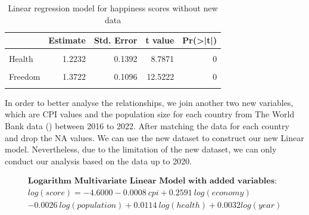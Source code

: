\documentclass[11pt,a4paper,]{article}
\begin{document}
\begin{table}

\caption{\label{tab:without}Linear regression model for happiness scores without new data}
\centering
\begin{tabular}[t]{l|r|r|r|r}
\hline
  & Estimate & Std. Error & t value & Pr(>|t|)\\
\hline
\cellcolor{gray!6}{(Intercept)} & \cellcolor{gray!6}{2.4374} & \cellcolor{gray!6}{0.0753} & \cellcolor{gray!6}{32.3704} & \cellcolor{gray!6}{0}\\
\hline
Health & 1.2232 & 0.1392 & 8.7871 & 0\\
\hline
\cellcolor{gray!6}{Economy} & \cellcolor{gray!6}{1.4543} & \cellcolor{gray!6}{0.0842} & \cellcolor{gray!6}{17.2820} & \cellcolor{gray!6}{0}\\
\hline
Freedom & 1.3722 & 0.1096 & 12.5222 & 0\\
\hline
\cellcolor{gray!6}{Generosity} & \cellcolor{gray!6}{1.1702} & \cellcolor{gray!6}{0.1397} & \cellcolor{gray!6}{8.3785} & \cellcolor{gray!6}{0}\\
\hline
\end{tabular}
\end{table}

In order to better analyse the relationships, we join another two new variables, which are CPI values and the population size for each country from The World Bank data (\textcite{world2022}) between 2016 to 2022. After matching the data for each country and drop the NA values. We can use the new dataset to construct our new Linear model. Nevertheless, due to the limitation of the new dataset, we can only conduct our analysis based on the data up to 2020.

\[
\begin{aligned}
\textbf{Logarithm Multivariate Linear Model with added variables}:\\
log(score)= -4.6000-0.0008\ cpi+0.2591\ log(economy)\\-0.0026\ log(population)+0.0114\ log(health)+0.0032log(year)
\end{aligned}
\]
\end{document}
